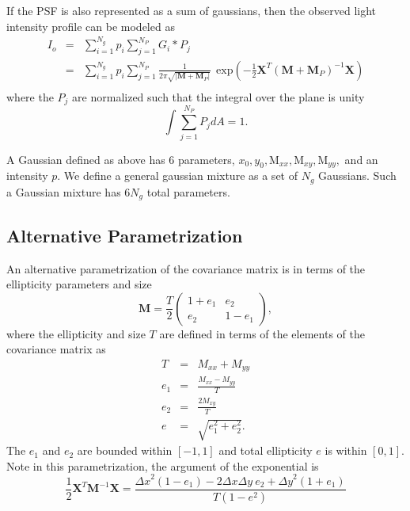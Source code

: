 \documentclass[12pt,preprint]{aastex}
\newcommand{\M}{\textbf{M}}
\newcommand{\X}{\textbf{X}}
\newcommand{\Dx}{\ensuremath{\Delta x}}
\newcommand{\Dy}{\ensuremath{\Delta y}}
\begin{document}
If the PSF is also represented as a sum of gaussians, then the observed
light intensity profile can be modeled as
\begin{eqnarray} \label{eq:postpsf}
I_o & = & \sum_{i=1}^{N_{g}} p_i \sum_{j=1}^{N_{P}} G_i * P_j \\
    & = & \sum_{i=1}^{N_{g}} p_i \sum_{j=1}^{N_{P}} \frac{1}{2 \pi \sqrt{|\M + \M_P|} } ~~ \textrm{exp}\left( -\frac{1}{2} \X^T (\M+\M_P)^{-1} \X \right) \\
\end{eqnarray}
where the $P_j$ are normalized such that the integral over
the plane is unity
\begin{equation}
\int \sum_{j=1}^{N_{P}} P_j dA = 1.
\end{equation}

A Gaussian defined as above has 6 parameters, $x_0, y_0, \textrm{M}_{xx},
\textrm{M}_{xy}, \textrm{M}_{yy},$ and an intensity $p$.  We define a general gaussian
mixture as a set of $N_g$ Gaussians.  Such a Gaussian 
mixture has $6 N_g$ total parameters.

\subsection{Alternative Parametrization}

An alternative parametrization of the covariance matrix is in
terms of the ellipticity parameters and size
\begin{equation}
\M = \frac{T}{2}\left( \begin{array}{cc}
1+e_1 & e_2 \\
e_2 & 1-e_1 \end{array} \right),
\end{equation}
where the ellipticity and size $T$ are defined in terms
of the elements of the covariance matrix as
\begin{eqnarray}
T & = & M_{xx} + M_{yy} \\
e_1 & = & \frac{M_{xx}-M_{yy}}{T} \\
e_2 & = & \frac{2 M_{xy}}{T} \\
e & = & \sqrt{e_1^2 + e_2^2}.
\end{eqnarray}
The $e_1$ and $e_2$ are bounded within $[-1,1]$ and total ellipticity $e$ is
within $[0,1]$.  Note in this parametrization, 
the argument of the exponential is
\begin{equation}
\frac{1}{2} \X^T \M^{-1} \X = \frac{\Dx^2 (1-e_1) - 2 \Dx \Dy~e_2 + \Dy^2 (1+e_1)}{T (1-e^2)}
\end{equation}
\end{document}
